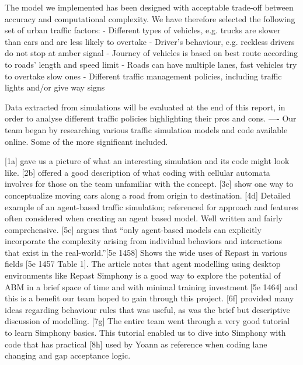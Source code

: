 \documentclass[11pt]{article}
\begin{document}
The model we implemented has been designed with acceptable trade-off between accuracy and computational complexity. We have therefore selected the following set of urban traffic factors:
-	Different types of vehicles, e.g. trucks are slower than cars and are less likely to overtake
-	Driver’s behaviour, e.g. reckless drivers do not stop at amber signal
-	Journey of vehicles is based on best route according to roads’ length and speed limit
-	Roads can have multiple lanes, fast vehicles try to overtake slow ones
-	Different traffic management policies, including traffic lights and/or give way signs

Data extracted from simulations will be evaluated at the end of this report, in order to analyse different traffic policies highlighting their pros and cons.
----
Our team began by researching various traffic simulation models and code available online. Some of the more significant included. 

[1a] gave us a picture of what an interesting simulation and its code might look like. [2b] offered a good description of what coding with cellular automata involves for those on the team unfamiliar with the concept.
[3c] show one way to conceptualize moving cars along a road from origin to destination. 
[4d] Detailed example of an agent-based traffic simulation; referenced for approach and features often considered when creating an agent based model. Well written and fairly comprehensive.
[5e] argues that “only agent-based models can explicitly incorporate the complexity arising from individual behaviors and interactions that exist in the real-world.”[5e 1458] Shows the wide uses of Repast in various fields [5e 1457 Table 1]. The article notes that agent modelling using desktop environments like Repast Simphony is a good way to explore the potential of ABM in a brief space of time and with minimal training investment [5e 1464] and this is a benefit our team hoped to gain through this project.
[6f] provided many ideas regarding behaviour rules that was useful, as was the brief but descriptive discussion of modelling.
[7g] The entire team went through a very good tutorial to learn Simphony basics. This tutorial enabled us to dive into Simphony with code that has practical 
[8h] used by Yoann as reference when coding lane changing and gap acceptance logic.
\end{document}
